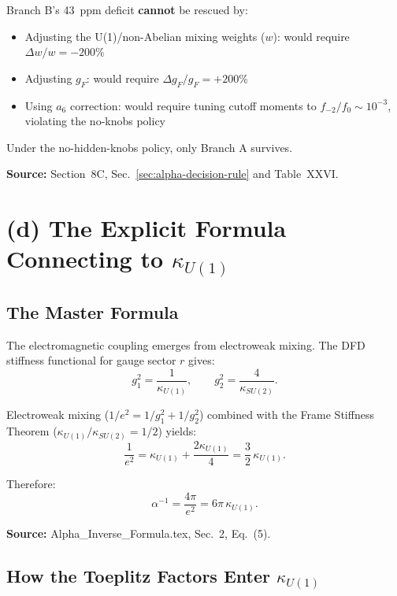 \documentclass[12pt,a4paper]{article}
\begin{document}
Branch B's 43~ppm deficit \textbf{cannot} be rescued by:
\begin{itemize}
\item Adjusting the U(1)/non-Abelian mixing weights ($w$): would require
  $\Delta w/w = -200\%$
\item Adjusting $g_F$: would require $\Delta g_F/g_F = +200\%$
\item Using $a_6$ correction: would require tuning cutoff moments to
  $f_{-2}/f_0 \sim 10^{-3}$, violating the no-knobs policy
\end{itemize}

Under the no-hidden-knobs policy, only Branch A survives.

\textbf{Source:} Section~8C, Sec.~\ref*{sec:alpha-decision-rule} and
Table~XXVI.

\section{(d) The Explicit Formula Connecting to $\kappa_{U(1)}$}
\label{sec:kappa}

\subsection{The Master Formula}

The electromagnetic coupling emerges from electroweak mixing. The DFD stiffness
functional for gauge sector $r$ gives:
\begin{equation}
g_1^2 = \frac{1}{\kappa_{U(1)}}, \qquad g_2^2 = \frac{4}{\kappa_{SU(2)}}.
\end{equation}

Electroweak mixing ($1/e^2 = 1/g_1^2 + 1/g_2^2$) combined with the Frame
Stiffness Theorem ($\kappa_{U(1)}/\kappa_{SU(2)} = 1/2$) yields:
\begin{equation}
\frac{1}{e^2} = \kappa_{U(1)} + \frac{2\kappa_{U(1)}}{4}
= \frac{3}{2}\,\kappa_{U(1)}.
\end{equation}

Therefore:
\begin{equation}
\boxed{\alpha^{-1} = \frac{4\pi}{e^2} = 6\pi\,\kappa_{U(1)}.}
\end{equation}

\textbf{Source:} Alpha\_Inverse\_Formula.tex, Sec.~2, Eq.~(5).

\subsection{How the Toeplitz Factors Enter $\kappa_{U(1)}$}
\end{document}
